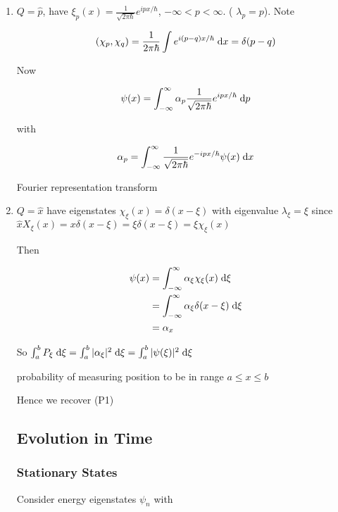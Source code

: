 \documentclass[a4paper]{article}
\begin{document}
\begin{eg}
	\begin{enumerate}
		\item $ Q = \hat{p} $, have $ \xi_{p}(x) = \frac{1}{\sqrt{2 \pi \hbar}}   e^{ipx / \hbar}  $, $ -\infty < p < \infty $. (  $ \lambda_{p} = p $). Note
		
		\[ (\chi_{p},\chi_{q}) = \frac{1}{2 \pi \hbar}  \int e^{i(p-q)  x / \hbar } \; \mathrm{d} x = \delta(p-q)  \]
		
		Now
		
		\[ \psi(x) = \int_{-\infty}^{\infty}  \alpha_{p} \frac{1}{\sqrt{2\pi \hbar}} e^{i p x / \hbar} \; \mathrm{d} p  \] 
		
		with 
		
		\[ \alpha_{p} = \int_{-\infty}^{\infty}  \frac{1}{\sqrt{2 \pi \hbar}} e^{- i p x / \hbar} \psi(x) \; \mathrm{d} x   \]
		
		Fourier representation transform
		
		\item $ Q = \hat{x} $ have eigenstates $ \chi_{\xi}(x) = \delta(x - \xi) $ with eigenvalue $ \lambda_{\xi} = \xi $ since $ \hat{x} X_{\xi}(x) = x \delta(x - \xi) = \xi \delta(x - \xi) = \xi \chi_{\xi}(x)  $	
		
		Then
		
		\begin{align*}
		\psi(x)   & =  \int_{-\infty}^{\infty}  \alpha_{\xi} \chi_{\xi}(x) \; \mathrm{d} \xi  \\
		& = \int_{-\infty}^{\infty}  \alpha_{\xi} \delta(x - \xi) \; \mathrm{d} \xi\\
		& = \alpha_{x}
		\end{align*}
		
		So $ \int_{a}^{b}  P_{\xi} \; \mathrm{d} \xi = \int_{a}^{b}  | \alpha_{\xi} |^{2} \; \mathrm{d} \xi = \int_{a}^{b} | \psi(\xi) |^{2} \; \mathrm{d} \xi  $
		
		probability of measuring position to be in range $ a \leq x \leq b $	
		
		Hence we recover (P1)
		
		
		\subsection{Evolution in Time}
		
		\subsubsection{Stationary States}	
		
		Consider energy eigenstates $ \psi_{n} $ with
		

\end{enumerate}
\end{eg}
\end{document}
